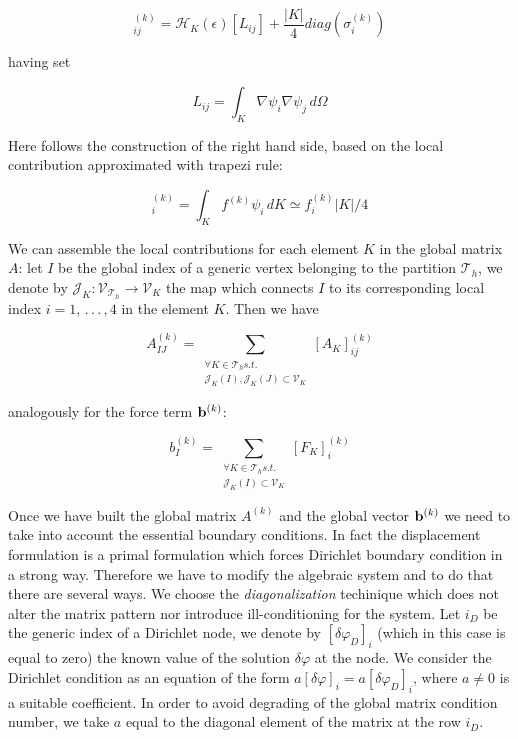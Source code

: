 \begin{equation}
[A_K]_{ij}^{(k)}  = \mathcal{H}_K(\epsilon)\left[
L_{ij}
\right]
+
\dfrac{|K|}{4}diag(\sigma^{(k)}_i)
\end{equation}

having set

\begin{equation}
L_{ij} = \int_K \nabla \psi_i  \nabla \psi_j \, d\Omega
\end{equation}

Here follows the construction of the right hand side, based on the local contribution approximated with trapezi rule:

\begin{equation}
[F_K]_i^{(k)} = \int_K f^{(k)} \psi_i \, dK \simeq f^{(k)}_i |K| / 4 
\end{equation}

We can assemble the local contributions for each element $K$ in the global matrix $A$: let $I$ be the global index of a generic vertex belonging to the partition $\mathcal{T}_h$, we denote by $\mathcal{J}_K: \mathcal{V}_{\mathcal{T}_h} \rightarrow \mathcal{V}_{K}$ the map which connects $I$ to its corresponding local index $i=1, \, . \, . \, . \, , 4$ in the element $K$. Then we have 

\begin{equation}
A_{IJ}^{(k)} = \sum_{\substack{\forall K \in \mathcal{T}_h s.t. \\ \mathcal{J}_K(I),\mathcal{J}_K(J) \subset \mathcal{V}_K}}
 [A_K]_{ij}^{(k)}
\end{equation}

analogously for the force term $\mathbf{b}^{(k)}$:

\begin{equation}
b_{I}^{(k)} = \sum_{\substack{\forall K \in \mathcal{T}_h s.t. \\ \mathcal{J}_K(I) \subset \mathcal{V}_K}}
 [F_K]_{i}^{(k)}
\end{equation}

Once we have built the global matrix $A^{(k)}$ and the global vector $\mathbf{b}^{(k)}$ we need to take into account the essential boundary conditions. In fact the displacement formulation is a primal formulation which forces Dirichlet boundary condition in a strong way. Therefore we have to modify the algebraic system and to do that there are several ways. We choose the \textit{diagonalization} techinique which does not alter the matrix pattern nor introduce ill-conditioning for the system.  Let $i_D$ be the generic index of a Dirichlet node, we denote by $[\delta \varphi_{D}]_i$ (which in this case is equal to zero) the known value of the solution $\delta \varphi $ at the node. We consider the Dirichlet condition as an equation of the form $a [\delta \varphi]_i = a [\delta \varphi_{D}]_i$, where $a\neq 0$ is a suitable coefficient. In order to avoid degrading of the global matrix condition number, we take $a$ equal to the diagonal element of the matrix at the row  $i_D$.


